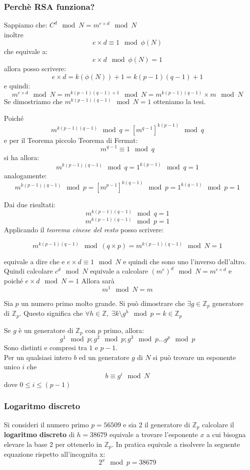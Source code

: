 \documentclass{beamer}
\begin{document}
\begin{frame}
\frametitle{Perchè RSA funziona?}
Sappiamo che:
  $  C^d \mod N=m^{e\times d} \mod N$\\ inoltre  \[\boxed{ e\times d \equiv1 \mod \phi(N)} \] che equivale a:\[ e\times d \mod \phi(N) =1 \]
allora posso scrivere: \[ e\times d=k(\phi(N))+1=k(p-1)(q-1)+1 \] e quindi:
\[ m^{e\times d} \mod N=m^{k(p-1)(q-1)+1} 	\mod N=m^{k(p-1)(q-1)}\times m 	\mod N \]
 Se dimostriamo che $\boxed{ m^{k(p-1)(q-1)} 	\mod N=1 }$ otteniamo la tesi.  
\end{frame}
\begin{frame}
Poiché \[m^{k(p-1)(q-1)} 	\mod q=[m^{q-1}]^{k(p-1)} 	\mod q  \]
e per il Teorema piccolo Teorema di Fermat: \[\boxed{ m^{q-1} \equiv 1 \mod q} \]
si ha allora: \[ m^{k(p-1)(q-1)} 	\mod q=1^{k(p-1)} 	\mod q=1 \] analogamente:
\[m^{k(p-1)(q-1)} 	\mod p=[m^{p-1}]^{k(q-1)} 	\mod p=1^{k(q-1)} \mod p=1  \]

\end{frame}
\begin{frame}
Dai due risultati: \[m^{k(p-1)(q-1)} 	\mod q=1\]  \[  m^{k(p-1)(q-1)} 	\mod p=1  \]
Applicando il \textit{teorema cinese del resto} posso scrivere:

\[ m^{k(p-1)(q-1)} 	\mod (q\times p)= m^{k(p-1)(q-1)} 	\mod N=1 \]  
\end{frame}
\begin{frame}

equivale a dire che e $ e \times d \equiv 1 \mod N $ e quindi che sono uno l'inverso dell'altro. Quindi calcolare $  c^d \mod N $ equivale a calcolare $ (m^e)^d \mod N=m^{e \times d} $ e poiché $ e \times d \mod N=1 $ Allora sarà  \[ m^1 \mod N =m  \]
\end{frame}

\begin{frame}
 Sia $ p $ un numero primo molto grande.  Si può dimostrare che $ \exists g \in \mathbb{Z}_p $ generatore di $ \mathbb{Z}_p $. Questo significa che  $\forall h \in \mathbb{Z},\; \exists k \setminus g^h \mod p=k \in \mathbb{Z}_p $ 
\end{frame}

\begin{frame}
Se $ g $ è un generatore di $ \mathbb{Z}_p $ con $ p $ primo, allora:
\[ g^1 \mod p ; g^2 \mod p ; g^3 \mod p \dots g^p \mod p\]
Sono distinti e compresi tra $ 1 $ e $ p-1 $.\\
 Per un qualsiasi intero $ b $ ed un generatore $ g $ di $ N $ si può trovare un esponente unico $ i $ che \[ b\equiv g^i \mod N \] dove $ 0 \leq i \leq (p-1) $
\end{frame}

\begin{frame}
  \frametitle{Logaritmo discreto}
  Si consideri il numero primo  $ p=56509 $ e sia 2  il generatore di $ \mathbb{Z}_p $ calcolare il \textbf{logaritmo discreto} di $ h=38679 $ equivale a trovare l'esponente $ x $ a cui bisogna elevare la base $ 2 $ per ottenerlo in $ \mathbb{Z}_p $.
  In pratica equivale a risolvere la seguente equazione rispetto all'incognita x:\[ 2^x \mod p=38679 \] 
\end{frame}
\end{document}
